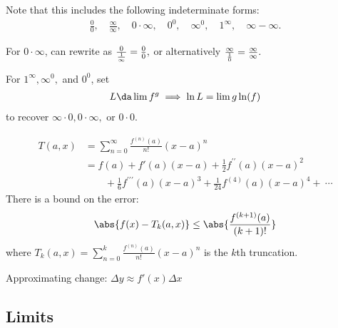 \begin{remark}

Note that this includes the following indeterminate forms:
\begin{align*}  
\frac{0}{0}, \quad \frac{\infty}{\infty}, \quad 0 \cdot \infty, \quad 0^{0}, \quad \infty^{0}, \quad 1^{\infty}, \quad \infty-\infty
.\end{align*}

For \(0\cdot \infty\), can rewrite as
\({0 \over {1\over \infty}} = {0\over 0},\) or alternatively
\({\infty \over {1\over 0}} = {\infty \over \infty}.\)

For \(1^\infty, \infty^0,\) and \(0^0\), set
\begin{align*}
L \da \lim f^g \implies \ln L = \lim g \ln(f)
\end{align*} to recover \(\infty\cdot 0, 0 \cdot \infty,\) or
\(0\cdot 0\).

\end{remark}

\begin{proposition}

\begin{align*}
T(a, x) &= \sum _ { n = 0 } ^ { \infty } \frac { f ^ { ( n ) } ( a ) } { n ! } ( x - a ) ^ { n }  \\
&= f ( a ) + f'(a)( x - a ) + \frac { 1 } { 2 }f ^ { \prime \prime } ( a ) ( x - a ) ^ { 2 } \\ 
& \quad \quad + \frac { 1} { 6 } f ^ { \prime \prime \prime } ( a ) ( x - a ) ^ { 3 } + \frac{1}{24}f^{(4)}(a)(x-a)^4 + ~\cdots
\end{align*} There is a bound on the error:
\begin{align*}
\abs{f(x) - T_k(a,x)} \leq \abs{\frac{f^{(k+1)}(a)}{(k+1)!}}
\end{align*} where
\(T_k(a, x) = \sum _ { n = 0 } ^ { k } \frac { f ^ { ( n ) } ( a ) } { n ! } ( x - a ) ^ { n }\)
is the \(k\)th truncation.

\end{proposition}

\begin{remark}

Approximating change: \(\Delta y \approx f'(x) \Delta x\)

\end{remark}

\hypertarget{limits}{%
\subsection{Limits}\label{limits}}

